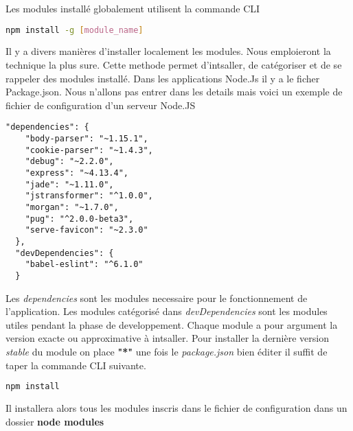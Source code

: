 Les modules installé globalement utilisent la commande CLI
\begin{lstlisting}[language=bash]
	npm install -g [module_name]
\end{lstlisting}

Il y a divers manières d'installer localement les modules. Nous emploieront la technique la plus sure. Cette methode permet d'intsaller, de catégoriser et de se rappeler des modules installé. Dans les applications Node.Js il y a le ficher Package.json. Nous n'allons pas entrer dans les details mais voici un exemple de fichier de configuration d'un serveur Node.JS
\begin{lstlisting}[style=htmlcssjs]
  "dependencies": {
    "body-parser": "~1.15.1",
    "cookie-parser": "~1.4.3",
    "debug": "~2.2.0",
    "express": "~4.13.4",
    "jade": "~1.11.0",
    "jstransformer": "^1.0.0",
    "morgan": "~1.7.0",
    "pug": "^2.0.0-beta3",
    "serve-favicon": "~2.3.0"
  },
  "devDependencies": {
    "babel-eslint": "^6.1.0"
  }
\end{lstlisting}
Les \textit{dependencies} sont les modules necessaire pour le fonctionnement de l'application. Les modules catégorisé dans \textit{devDependencies} sont les modules utiles pendant la phase de developpement. Chaque module a pour argument la version exacte ou approximative à intsaller. Pour installer la dernière version \textit{stable} du module on place \textbf{"*"}
une fois le \textit{package.json} bien éditer il suffit de taper la commande CLI suivante.
\begin{lstlisting}[language=bash]
	npm install 
\end{lstlisting}
Il installera alors tous les modules inscris dans le fichier de configuration dans un dossier \textbf{node modules}